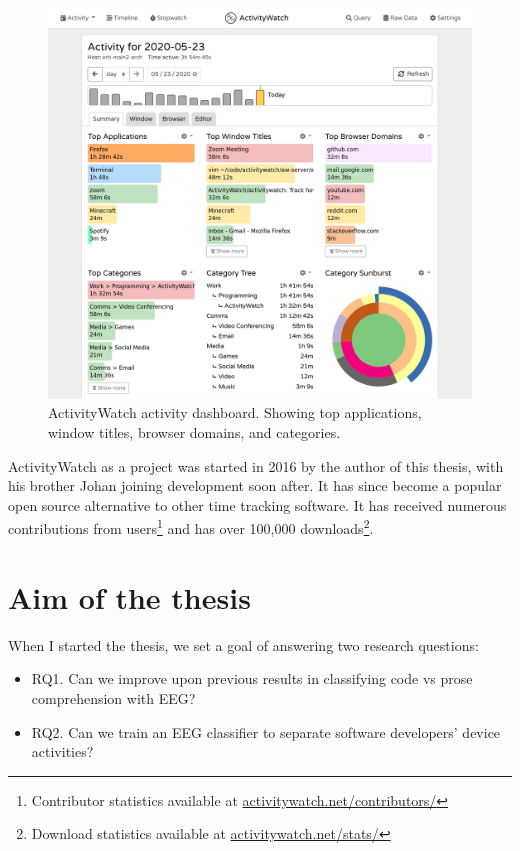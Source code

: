         \begin{figure}[h]
        \centering
        \includegraphics[width=12cm]{img/screenshot-aw-activity.png}
        \caption{ActivityWatch activity dashboard. Showing top applications, window titles, browser domains, and categories.}\label{fig:aw}
        \end{figure}

        ActivityWatch as a project was started in 2016 by the author of this thesis, with his brother Johan joining development soon after. It has since become a popular open source alternative to other time tracking software. It has received numerous contributions from users\footnote{Contributor statistics available at \href{https://activitywatch.net/contributors/}{activitywatch.net/contributors/}} and has over 100,000 downloads\footnote{Download statistics available at \href{https://activitywatch.net/stats/}{activitywatch.net/stats/}}.


\section{Aim of the thesis}\label{section:aim}

    When I started the thesis, we set a goal of answering two research questions:

    \begin{itemize}
            \item RQ1. Can we improve upon previous results in classifying code vs prose comprehension with EEG\@?
            \item RQ2. Can we train an EEG classifier to separate software developers’ device activities?
    \end{itemize}

